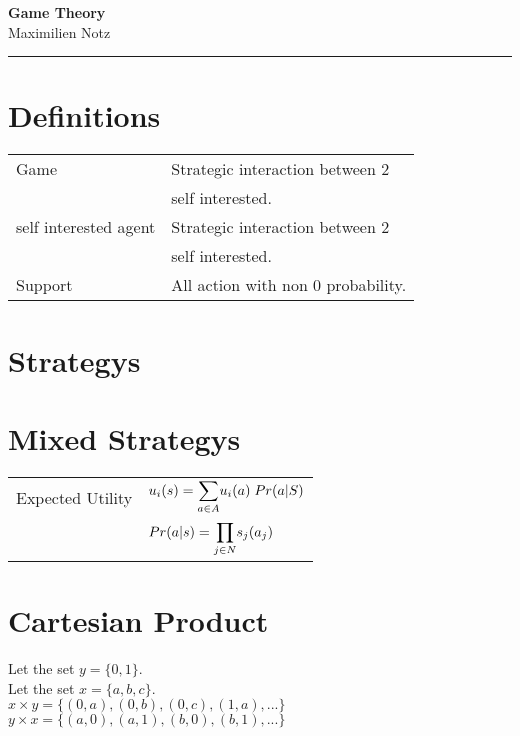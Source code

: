 \documentclass[5pt]{article}
\begin{document}
\begin{center}
     \Large{\textbf{Game Theory}}\\
     \small{}\hfill\small{\textcopyright Maximilien Notz \the\year{}}
     \noindent\rule{20.2cm}{0.4pt}
\end{center}


\begin{multicols}{2}
\setcounter{secnumdepth}{0}


\section{Definitions}
\begin{tabular}{ll}
Game & Strategic interaction between 2 \\ &self interested.\\
self interested agent & Strategic interaction between 2 \\ &self interested.\\

Support & All action with non 0 probability.\\
\end{tabular}

\section{Strategys}

\section{Mixed Strategys}
\begin{tabular}{ll}
Expected Utility & $u_i(s)=\mathlarger{\sum_{a\in A}}u_i(a)\;Pr(a|S)$\\
& $Pr(a|s)=\mathlarger{\prod_{j\in N}} s_j(a_j)$\\
\end{tabular}


\section{Cartesian Product}
Let the set $y=\{0,1\}$.\\
Let the set $x=\{a,b,c\}$.\\
$x\times y = \{(0,a),(0,b),(0,c),(1,a),...\}$\\
$y\times x = \{(a,0),(a,1),(b,0),(b,1),...\}$\\



\end{multicols}
\end{document}
